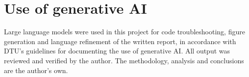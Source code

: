 \chapter*{Use of generative AI}

Large language models were used in this project for code troubleshooting,
figure generation and language refinement of the written report, in accordance
with DTU's guidelines for documenting the use of generative AI. All output was
reviewed and verified by the author. The methodology, analysis and conclusions
are the author's own.
